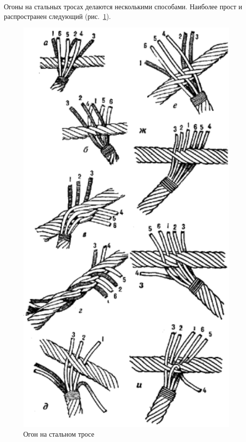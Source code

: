 \documentclass[a4paper, 12pt, twoside, final]{scrbook}
\begin{document}
Огоны на стальных тросах делаются несколькими способами. Наиболее прост и распространен следующий (рис.~\ref{fig:67}).

\begin{figure}[htbp]
   \centering
   \includegraphics{pics/67_Ogon_na_st_trose} %
   \caption{Огон на стальном тросе}
   \label{fig:67}
\end{figure}
\end{document}
